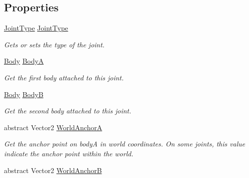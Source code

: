 \subsection*{Properties}
\begin{DoxyCompactItemize}
\item 
\hyperlink{namespace_farseer_physics_1_1_dynamics_1_1_joints_a9cdf2fbf2838f915432565f0d0953749}{Joint\+Type} \hyperlink{class_farseer_physics_1_1_dynamics_1_1_joints_1_1_joint_acad2ef95a496b3c32b1ccec4f5cca2d5}{Joint\+Type}
\begin{DoxyCompactList}\small\item\em Gets or sets the type of the joint. \end{DoxyCompactList}\item 
\hyperlink{class_farseer_physics_1_1_dynamics_1_1_body}{Body} \hyperlink{class_farseer_physics_1_1_dynamics_1_1_joints_1_1_joint_a37bb538e0112f8536d86e352b4f1d4bc}{Body\+A}
\begin{DoxyCompactList}\small\item\em Get the first body attached to this joint. \end{DoxyCompactList}\item 
\hyperlink{class_farseer_physics_1_1_dynamics_1_1_body}{Body} \hyperlink{class_farseer_physics_1_1_dynamics_1_1_joints_1_1_joint_a9889e8bfcb93d07f36e67404dadf30fa}{Body\+B}
\begin{DoxyCompactList}\small\item\em Get the second body attached to this joint. \end{DoxyCompactList}\item 
abstract Vector2 \hyperlink{class_farseer_physics_1_1_dynamics_1_1_joints_1_1_joint_a58837c0ff61a2e98ae532d9be154a08f}{World\+Anchor\+A}
\begin{DoxyCompactList}\small\item\em Get the anchor point on body\+A in world coordinates. On some joints, this value indicate the anchor point within the world. \end{DoxyCompactList}\item 
abstract Vector2 \hyperlink{class_farseer_physics_1_1_dynamics_1_1_joints_1_1_joint_afd3cafa4220f3ac2091b4357ded5bffb}{World\+Anchor\+B}

\end{DoxyCompactItemize}
